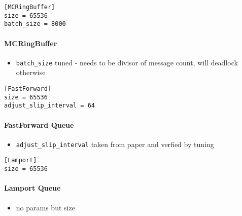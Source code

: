 \begin{verbatim}
[MCRingBuffer]
size = 65536
batch_size = 8000
\end{verbatim}
\paragraph{MCRingBuffer}
\begin{itemize}
    \item \texttt{batch\_size} tuned - needs to be divisor of message count, will deadlock otherwise
\end{itemize}

\begin{verbatim}
[FastForward]
size = 65536
adjust_slip_interval = 64
\end{verbatim}
\paragraph{FastForward Queue}
\begin{itemize}
    \item \texttt{adjust\_slip\_interval} taken from paper and verfied by tuning
\end{itemize}

\begin{verbatim}
[Lamport]
size = 65536
\end{verbatim}
\paragraph{Lamport Queue}
\begin{itemize}
    \item no params but size
\end{itemize}

